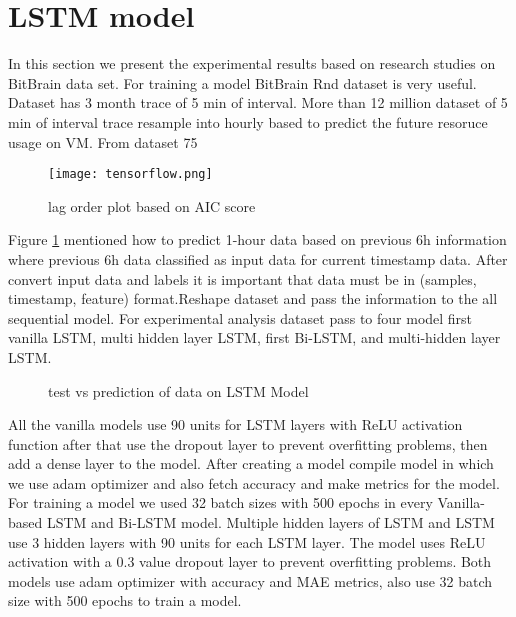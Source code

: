 \section{LSTM model}
In this section we present the experimental results based on research studies on BitBrain data set. 
For training a model BitBrain Rnd dataset is very useful. Dataset has 3 month trace of 5 min of interval. More than 12 million dataset of 5 min of interval trace resample into hourly based to predict the future resoruce usage on VM. From dataset 75%
\begin{figure}
  \centering
    
      \texttt{[image: tensorflow.png]}
  \caption{lag order plot based on AIC score}
  \label{fig:nn}
\end{figure}
Figure \ref{fig:nn} mentioned how to predict 1-hour data based on previous 6h information where previous 6h data classified as input data for current timestamp data. After convert input data and labels it is important that data must be in (samples, timestamp, feature) format.Reshape dataset and pass the information to the all sequential model. For experimental analysis dataset pass to four model first vanilla LSTM, multi hidden layer LSTM, first Bi-LSTM, and multi-hidden layer LSTM.


\begin{figure}[htp]



\caption{test vs prediction of data on LSTM Model }
\label{fig:vanilla}
\end{figure}
All the vanilla models use 90 units for LSTM  layers with ReLU activation function after that use the dropout layer to prevent overfitting problems, then add a dense layer to the model. After creating a model compile model in which we use adam optimizer and also fetch accuracy and make metrics for the model. For training a model we used 32 batch sizes with 500 epochs in every Vanilla-based LSTM and Bi-LSTM model. Multiple hidden layers of LSTM and LSTM use 3 hidden layers with 90 units for each LSTM layer. The model uses ReLU activation with a 0.3 value dropout layer to prevent overfitting problems. Both models use adam optimizer with accuracy and MAE metrics, also use 32 batch size with 500 epochs to train a model.

